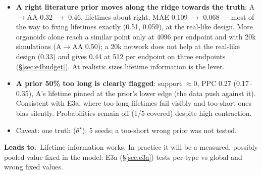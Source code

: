 \documentclass[10pt,a4paper]{article}
\newcommand{\blk}[1]{\par\needspace{5\baselineskip}\smallskip{\sffamily\bfseries\color{inkgray}#1}\par}
\newcommand{\Comment}{\blk{Comment}}
\newcommand{\Leads}[1]{\begin{leadbox}{\sffamily\bfseries\color{caqua!70!black}Leads to.}\ #1\end{leadbox}}
\renewcommand{\blk}[1]{\par\Needspace*{5\baselineskip}\smallskip{\sffamily\bfseries\color{inkgray}#1}\par}
\newcommand{\sref}[1]{\S\ref{#1}}
\begin{document}
\Comment
\begin{itemize}
\item \textbf{A right literature prior moves along the ridge towards the truth}: A$\to$AA 0.32 $\to$ 0.46, lifetimes about right, MAE 0.109 $\to$ 0.068 --- most of the way to fixing lifetimes exactly (0.51, 0.059), at the real-like design. More organoids alone reach a similar point only at 4096 per endpoint and with 20k simulations (A$\to$AA 0.50); a 20k network does not help at the real-like design (0.33) and gives 0.44 at 512 per endpoint on three endpoints (\sref{sec:e4budget}). At realistic sizes lifetime information is the lever.
\item \textbf{A prior 50\% too long is clearly flagged}: support $\approx 0$, PPC 0.27 (0.17--0.35), A's lifetime pinned at the prior's lower edge (the data push against it). Consistent with E3a, where too-long lifetimes fail visibly and too-short ones bias silently. Probabilities remain off (1/5 covered) despite high contraction.
\item Caveat: one truth ($\theta^\star$), 5 seeds; a too-short wrong prior was not tested.
\end{itemize}
\Leads{Lifetime information works. In practice it will be a measured, possibly pooled value fixed in the model: E3a (\sref{sec:e3a}) tests per-type vs global and wrong fixed values.}
\end{document}
